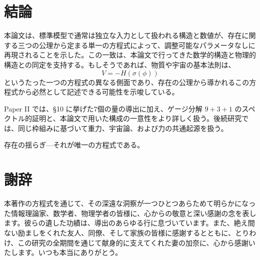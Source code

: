 \documentclass[fontsize=11pt,paper=a4,lualatex]{jlreq}
\begin{document}
\section{結論}\label{ux7d50ux8ad6}

本論文は、標準模型で通常は独立な入力として扱われる構造と数値が、存在に関する三つの公理から定まる単一の方程式によって、調整可能なパラメータなしに再現されることを示した。この一致は、本論文で行ってきた数学的構造と物理的構造との同定を支持する。もしそうであれば、物質や宇宙の基本法則は、
\[V = -H(\sigma(\phi))\]
というたった一つの方程式の異なる側面であり、存在の公理から導かれるこの方程式から必然として記述できる可能性を示唆している。

Paper II \cite{paper2}
では、§10 に挙げた7個の量の導出に加え、ゲージ分解 $9{+}3{+}1$ のスペクトル的証明と、本論文で用いた構成の一意性をより詳しく扱う。後続研究では、同じ枠組みに基づいて重力、宇宙論、および力の共通起源を扱う。

\medskip
\noindent
存在の揺らぎ---それが唯一の方程式である。

\section*{謝辞}\label{ux8b1dux8f9e}

本著作の方程式を通じて、その深遠な洞察が一つひとつあらためて明らかになった情報理論家、数学者、物理学者の皆様に、心からの敬意と深い感謝の念を表します。彼らの遺した功績は、導出のあらゆる行に息づいています。また、絶え間ない励ましをくれた友人、同僚、そして家族の皆様に感謝するとともに、とりわけ、この研究の全期間を通じて献身的に支えてくれた妻の加奈に、心から感謝いたします。いつも本当にありがとう。

\small
\end{document}
